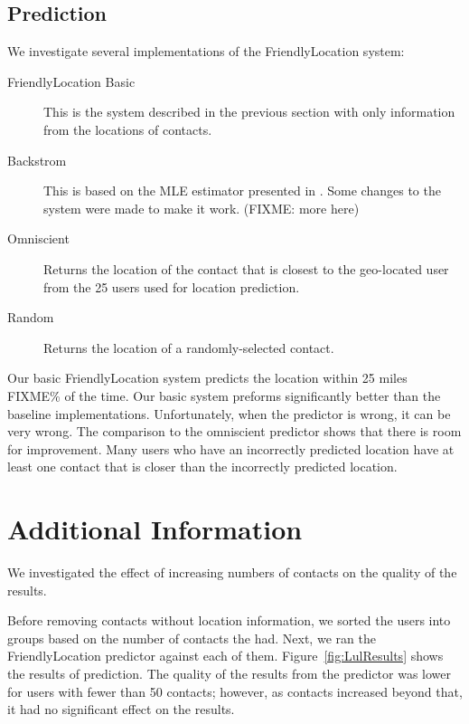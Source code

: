 \subsection{Prediction}
We investigate several implementations of the FriendlyLocation system:
\begin{description}
\item[FriendlyLocation Basic] This is the system described in the previous
    section with only information from the locations of contacts.
\item[Backstrom] This is based on the MLE estimator presented in
    \cite{backstrom2010find}. Some changes to the system were made to make it
    work. (FIXME: more here)
\item[Omniscient] Returns the location of the contact that is closest to the
    geo-located user from the 25 users used for location prediction.
\item[Random] Returns the location of a randomly-selected contact.
\end{description}

Our basic FriendlyLocation system predicts the location within 25 miles FIXME\% of
the time.
%
Our basic system preforms significantly better than the baseline implementations.
%
Unfortunately, when the predictor is wrong, it can be very wrong.
%
The comparison to the omniscient predictor shows that there is room for improvement.
%
Many users who have an incorrectly predicted location have at least one contact
that is closer than the incorrectly predicted location.


\section{Additional Information}
We investigated the effect of increasing numbers of contacts on the quality of
the results.

Before removing contacts without location information, we sorted the users into
groups based on the number of contacts the had.
Next, we ran the FriendlyLocation predictor against each of them.
Figure~\ref{fig:LulResults} shows the results of prediction.
The quality of the results from the predictor was lower for users with fewer
than 50 contacts; however, as contacts increased beyond that, it had no
significant effect on the results.

